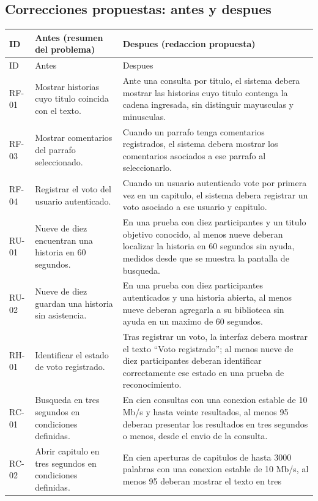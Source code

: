 \documentclass[11pt,a4paper]{article}
\begin{document}
\subsection{Correcciones propuestas: antes y despues}
\small
\begin{longtable}{|p{1.25cm}|p{5.8cm}|p{7.2cm}|}
\hline
ID & Antes (resumen del problema) & Despues (redaccion propuesta)\\ \hline
\endfirsthead
\hline ID & Antes & Despues\\ \hline\endhead
RF-01 & Mostrar historias cuyo titulo coincida con el texto. &
Ante una consulta por titulo, el sistema debera mostrar las historias
cuyo titulo contenga la cadena ingresada, sin distinguir mayusculas
y minusculas.\\ \hline
RF-03 & Mostrar comentarios del parrafo seleccionado. &
Cuando un parrafo tenga comentarios registrados, el sistema debera
mostrar los comentarios asociados a ese parrafo al seleccionarlo.\\ \hline
RF-04 & Registrar el voto del usuario autenticado. &
Cuando un usuario autenticado vote por primera vez en un capitulo,
el sistema debera registrar un voto asociado a ese usuario y capitulo.\\ \hline
RU-01 & Nueve de diez encuentran una historia en 60 segundos. &
En una prueba con diez participantes y un titulo objetivo conocido,
al menos nueve deberan localizar la historia en 60 segundos sin ayuda,
medidos desde que se muestra la pantalla de busqueda.\\ \hline
RU-02 & Nueve de diez guardan una historia sin asistencia. &
En una prueba con diez participantes autenticados y una historia
abierta, al menos nueve deberan agregarla a su biblioteca sin ayuda
en un maximo de 60 segundos.\\ \hline
RH-01 & Identificar el estado de voto registrado. &
Tras registrar un voto, la interfaz debera mostrar el texto
``Voto registrado''; al menos nueve de diez participantes deberan
identificar correctamente ese estado en una prueba de reconocimiento.\\ \hline
RC-01 & Busqueda en tres segundos en condiciones definidas. &
En cien consultas con una conexion estable de 10 Mb/s y hasta veinte
resultados, al menos 95 deberan presentar los resultados en tres
segundos o menos, desde el envio de la consulta.\\ \hline
RC-02 & Abrir capitulo en tres segundos en condiciones definidas. &
En cien aperturas de capitulos de hasta 3000 palabras con una conexion
estable de 10 Mb/s, al menos 95 deberan mostrar el texto en tres

\end{longtable}
\end{document}
